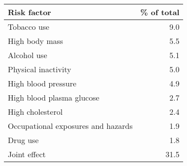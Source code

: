 \bgroup
\def\arraystretch{1.2}
\begin{tabular}{lr}
\toprule
\textbf{Risk factor} & \textbf{\% of total} \\ 
\midrule
Tobacco use & 9.0 \\
High body mass & 5.5 \\
Alcohol use & 5.1 \\
Physical inactivity & 5.0 \\
High blood pressure & 4.9 \\
High blood plasma glucose & 2.7 \\
High cholesterol & 2.4 \\
Occupational exposures and hazards & 1.9 \\
Drug use & 1.8 \\
Joint effect & 31.5 \\
\bottomrule
\end{tabular}
\egroup